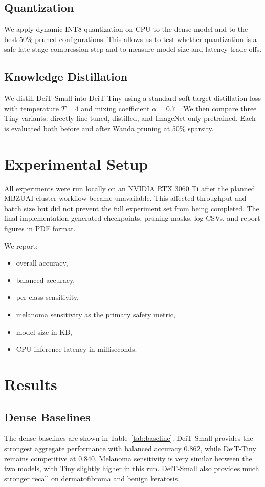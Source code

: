 \documentclass[11pt]{article}
\begin{document}
\subsection{Quantization}
We apply dynamic INT8 quantization on CPU to the dense model and to the best 50\% pruned configurations. This allows us to test whether quantization is a safe late-stage compression step and to measure model size and latency trade-offs.

\subsection{Knowledge Distillation}
We distill DeiT-Small into DeiT-Tiny using a standard soft-target distillation loss with temperature $T=4$ and mixing coefficient $\alpha=0.7$~\cite{hinton2015distillation}. We then compare three Tiny variants: directly fine-tuned, distilled, and ImageNet-only pretrained. Each is evaluated both before and after Wanda pruning at 50\% sparsity.

\section{Experimental Setup}
All experiments were run locally on an NVIDIA RTX 3060 Ti after the planned MBZUAI cluster workflow became unavailable. This affected throughput and batch size but did not prevent the full experiment set from being completed. The final implementation generated checkpoints, pruning masks, log CSVs, and report figures in PDF format.

We report:
\begin{itemize}[leftmargin=1.2em]
    \item overall accuracy,
    \item balanced accuracy,
    \item per-class sensitivity,
    \item melanoma sensitivity as the primary safety metric,
    \item model size in KB,
    \item CPU inference latency in milliseconds.
\end{itemize}

\section{Results}

\subsection{Dense Baselines}
The dense baselines are shown in Table~\ref{tab:baseline}. DeiT-Small provides the strongest aggregate performance with balanced accuracy $0.862$, while DeiT-Tiny remains competitive at $0.840$. Melanoma sensitivity is very similar between the two models, with Tiny slightly higher in this run. DeiT-Small also provides much stronger recall on dermatofibroma and benign keratosis.
\end{document}

